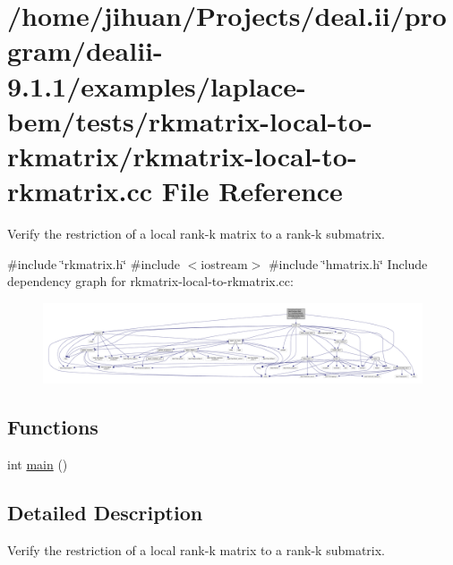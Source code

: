 \hypertarget{rkmatrix-local-to-rkmatrix_8cc}{}\section{/home/jihuan/\+Projects/deal.ii/program/dealii-\/9.1.1/examples/laplace-\/bem/tests/rkmatrix-\/local-\/to-\/rkmatrix/rkmatrix-\/local-\/to-\/rkmatrix.cc File Reference}
\label{rkmatrix-local-to-rkmatrix_8cc}


Verify the restriction of a local rank-\/k matrix to a rank-\/k submatrix.  


{\ttfamily \#include \char`\"{}rkmatrix.\+h\char`\"{}}\newline
{\ttfamily \#include $<$iostream$>$}\newline
{\ttfamily \#include \char`\"{}hmatrix.\+h\char`\"{}}\newline
Include dependency graph for rkmatrix-\/local-\/to-\/rkmatrix.cc\+:\nopagebreak
\begin{figure}[H]
\begin{center}
\leavevmode
\includegraphics[width=350pt]{rkmatrix-local-to-rkmatrix_8cc__incl}
\end{center}
\end{figure}
\subsection*{Functions}
\begin{DoxyCompactItemize}
\item 
int \hyperlink{rkmatrix-local-to-rkmatrix_8cc_ae66f6b31b5ad750f1fe042a706a4e3d4}{main} ()
\end{DoxyCompactItemize}


\subsection{Detailed Description}
Verify the restriction of a local rank-\/k matrix to a rank-\/k submatrix. 

